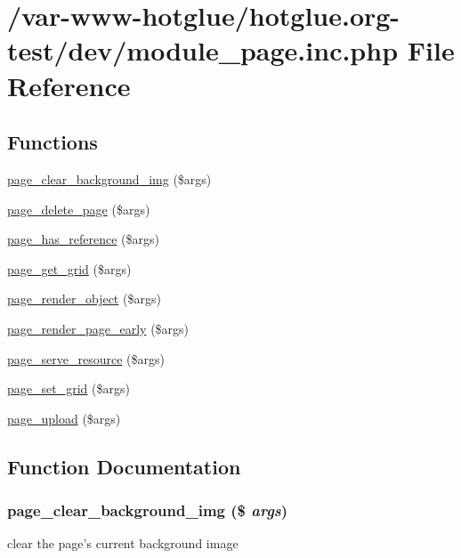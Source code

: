 \hypertarget{module__page_8inc_8php}{
\section{/var-\/www-\/hotglue/hotglue.org-\/test/dev/module\_\-page.inc.php File Reference}
\label{module__page_8inc_8php}
}
\subsection*{Functions}
\begin{DoxyCompactItemize}
\item 
\hyperlink{module__page_8inc_8php_a6bef3e7d1d82b4117ed83e4c72b5d652}{page\_\-clear\_\-background\_\-img} (\$args)
\item 
\hyperlink{module__page_8inc_8php_aedf11987fbd07763073255783077951b}{page\_\-delete\_\-page} (\$args)
\item 
\hyperlink{module__page_8inc_8php_a0184f1023facb8121f9a99348c978d55}{page\_\-has\_\-reference} (\$args)
\item 
\hyperlink{module__page_8inc_8php_aac90d98ff7e17055e3dc3d953371d673}{page\_\-get\_\-grid} (\$args)
\item 
\hyperlink{module__page_8inc_8php_a53e7091b9a654d0d772cea6e3127820e}{page\_\-render\_\-object} (\$args)
\item 
\hyperlink{module__page_8inc_8php_a80aff2ea069c7a2ba120e26bb218efa5}{page\_\-render\_\-page\_\-early} (\$args)
\item 
\hyperlink{module__page_8inc_8php_a4072227b7cf50c8d7bb6f49d85d95c39}{page\_\-serve\_\-resource} (\$args)
\item 
\hyperlink{module__page_8inc_8php_aaadab51471c838ab9a0fa0c93a04b817}{page\_\-set\_\-grid} (\$args)
\item 
\hyperlink{module__page_8inc_8php_a0b7e8997d0fe2f4725a68e158f2d0fb5}{page\_\-upload} (\$args)
\end{DoxyCompactItemize}


\subsection{Function Documentation}
\hypertarget{module__page_8inc_8php_a6bef3e7d1d82b4117ed83e4c72b5d652}{
\subsubsection[{page\_\-clear\_\-background\_\-img}]{\setlength{\rightskip}{0pt plus 5cm}page\_\-clear\_\-background\_\-img (\$ {\em args})}}
\label{module__page_8inc_8php_a6bef3e7d1d82b4117ed83e4c72b5d652}
clear the page's current background image


